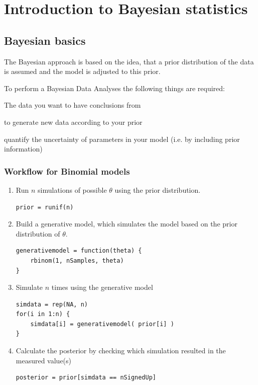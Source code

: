 \section{Introduction to Bayesian statistics}

\subsection{Bayesian basics}

The Bayesian approach is based on the idea, that a prior distribution of the data is assumed and the model is adjusted to this prior.

To perform a Bayesian Data Analyses the following things are required:
\begin{description}
	\tightlist
	\item[observed Data] The data you want to have conclusions from
	\item[generativer Model] to generate new data according to your prior
	\item[prior information] quantify the uncertainty of parameters in your model (i.e. by including prior information)
\end{description}

\subsubsection{Workflow for Binomial models}
\begin{enumerate}
	\tightlist
	\item Run $n$ simulations of possible $\theta$ using the prior distribution.
	\begin{lstlisting}
prior = runif(n)
	\end{lstlisting}
	\item Build a generative model, which simulates the model based on the prior distribution of $\theta$.
	\begin{lstlisting}
generativemodel = function(theta) {
	rbinom(1, nSamples, theta)
}
	\end{lstlisting}
	\item Simulate $n$ times using the generative model
	\begin{lstlisting}
simdata = rep(NA, n)
for(i in 1:n) {
	simdata[i] = generativemodel( prior[i] )
}
	\end{lstlisting}
	\item Calculate the posterior by checking which simulation resulted in the measured value(s)
	\begin{lstlisting}
posterior = prior[simdata == nSignedUp]
	\end{lstlisting}
\end{enumerate}

